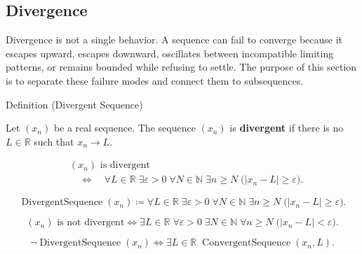 \subsection*{Divergence}
\begin{exposition}
Divergence is not a single behavior. A sequence can fail to converge because
it escapes upward, escapes downward, oscillates between incompatible limiting
patterns, or remains bounded while refusing to settle. The purpose of this
section is to separate these failure modes and connect them to subsequences.
\end{exposition}


\begin{definitionbox}{Definition (Divergent Sequence)}
\begin{definition}
\label{def:divergent-sequence}
Let $(x_n)$ be a real sequence. The sequence $(x_n)$ is
\textbf{divergent} if there is no $L\in\mathbb{R}$ such that
$x_n\to L$.
\end{definition}
\end{definitionbox}

\begin{remark*}
\[
\begin{aligned}
&(x_n)\text{ is divergent}\\
&\quad\Longleftrightarrow\quad
\forall L\in\mathbb{R}\;\exists \varepsilon>0\;\forall N\in\mathbb{N}
\;\exists n\ge N\;\bigl(|x_n-L|\ge\varepsilon\bigr).
\end{aligned}
\]
\end{remark*}

\begin{remark*}
\[
\operatorname{DivergentSequence}(x_n)
\coloneqq
\forall L\in\mathbb{R}\;\exists \varepsilon>0\;\forall N\in\mathbb{N}
\;\exists n\ge N\;\bigl(|x_n-L|\ge\varepsilon\bigr).
\]
\end{remark*}

\begin{remark*}
\[
(x_n)\text{ is not divergent}
\Longleftrightarrow
\exists L\in\mathbb{R}\;\forall \varepsilon>0\;\exists N\in\mathbb{N}
\;\forall n\ge N\;\bigl(|x_n-L|<\varepsilon\bigr).
\]
\end{remark*}

\begin{remark*}
\[
\neg\operatorname{DivergentSequence}(x_n)
\Longleftrightarrow
\exists L\in\mathbb{R}\;\operatorname{ConvergentSequence}(x_n,L).
\]
\end{remark*}

